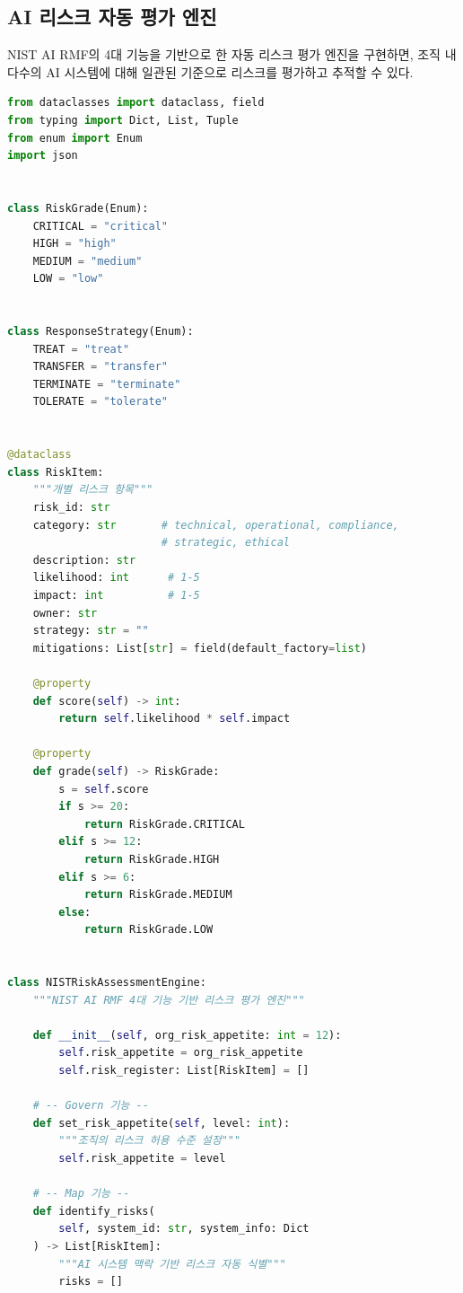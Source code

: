 \subsection{AI 리스크 자동 평가 엔진}
\label{sec:5.3.6}

NIST AI RMF의 4대 기능을 기반으로 한 자동 리스크 평가 엔진을 구현하면, 조직 내 다수의 AI 시스템에 대해 일관된 기준으로 리스크를 평가하고 추적할 수 있다.

\begin{lstlisting}[language=Python, caption={NIST AI RMF 기반 리스크 자동 평가 엔진}, label={lst:risk_engine}]
from dataclasses import dataclass, field
from typing import Dict, List, Tuple
from enum import Enum
import json


class RiskGrade(Enum):
    CRITICAL = "critical"
    HIGH = "high"
    MEDIUM = "medium"
    LOW = "low"


class ResponseStrategy(Enum):
    TREAT = "treat"
    TRANSFER = "transfer"
    TERMINATE = "terminate"
    TOLERATE = "tolerate"


@dataclass
class RiskItem:
    """개별 리스크 항목"""
    risk_id: str
    category: str       # technical, operational, compliance,
                        # strategic, ethical
    description: str
    likelihood: int      # 1-5
    impact: int          # 1-5
    owner: str
    strategy: str = ""
    mitigations: List[str] = field(default_factory=list)

    @property
    def score(self) -> int:
        return self.likelihood * self.impact

    @property
    def grade(self) -> RiskGrade:
        s = self.score
        if s >= 20:
            return RiskGrade.CRITICAL
        elif s >= 12:
            return RiskGrade.HIGH
        elif s >= 6:
            return RiskGrade.MEDIUM
        else:
            return RiskGrade.LOW


class NISTRiskAssessmentEngine:
    """NIST AI RMF 4대 기능 기반 리스크 평가 엔진"""

    def __init__(self, org_risk_appetite: int = 12):
        self.risk_appetite = org_risk_appetite
        self.risk_register: List[RiskItem] = []

    # -- Govern 기능 --
    def set_risk_appetite(self, level: int):
        """조직의 리스크 허용 수준 설정"""
        self.risk_appetite = level

    # -- Map 기능 --
    def identify_risks(
        self, system_id: str, system_info: Dict
    ) -> List[RiskItem]:
        """AI 시스템 맥락 기반 리스크 자동 식별"""
        risks = []


\end{lstlisting}
